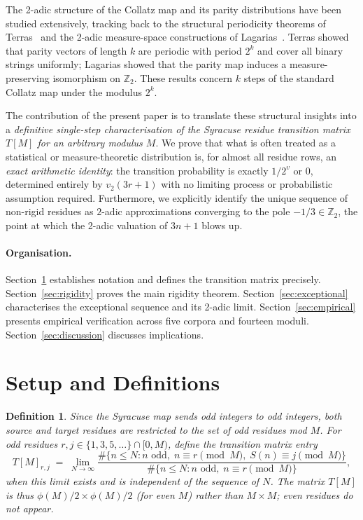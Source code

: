 \documentclass[12pt,a4paper]{article}
\newtheorem{definition}[theorem]{Definition}
\newcommand{\Ztwo}{\mathbb{Z}_2}
\begin{document}
The 2-adic structure of the Collatz map and its parity distributions have
been studied extensively, tracking back to the structural periodicity theorems
of Terras~\cite{Terras1976} and the 2-adic measure-space constructions of
Lagarias~\cite{Lagarias1985}.  Terras showed that parity vectors of length $k$
are periodic with period $2^k$ and cover all binary strings uniformly; Lagarias
showed that the parity map induces a measure-preserving isomorphism on
$\Ztwo$.  These results concern $k$ steps of the standard Collatz map under
the modulus $2^k$.

The contribution of the present paper is to translate these structural
insights into a \emph{definitive single-step characterisation of the Syracuse
residue transition matrix $T[M]$ for an arbitrary modulus $M$}.  We prove
that what is often treated as a statistical or measure-theoretic distribution
is, for almost all residue rows, an \emph{exact arithmetic identity}: the
transition probability is exactly $1/2^v$ or $0$, determined entirely by
$v_2(3r+1)$ with no limiting process or probabilistic assumption required.
Furthermore, we explicitly identify the unique sequence of non-rigid residues
as $2$-adic approximations converging to the pole $-1/3 \in \Ztwo$, the point
at which the 2-adic valuation of $3n+1$ blows up.

\paragraph{Organisation.}
Section~\ref{sec:setup} establishes notation and defines the transition matrix
precisely.  Section~\ref{sec:rigidity} proves the main rigidity theorem.
Section~\ref{sec:exceptional} characterises the exceptional sequence and its
2-adic limit.  Section~\ref{sec:empirical} presents empirical verification
across five corpora and fourteen moduli.  Section~\ref{sec:discussion} discusses
implications.

\section{Setup and Definitions}
\label{sec:setup}

\begin{definition}
Since the Syracuse map sends odd integers to odd integers, both source and target
residues are restricted to the set of odd residues mod $M$.  For odd residues
$r, j \in \{1, 3, 5, \ldots\} \cap [0, M)$, define the \emph{transition matrix
entry}
\[
  T[M]_{r,j} \;=\; \lim_{N\to\infty}
  \frac{\#\{n \leq N : n \text{ odd},\; n \equiv r \pmod{M},\; S(n) \equiv j \pmod{M}\}}
       {\#\{n \leq N : n \text{ odd},\; n \equiv r \pmod{M}\}},
\]
when this limit exists and is independent of the sequence of $N$.  The matrix
$T[M]$ is thus $\phi(M)/2 \times \phi(M)/2$ (for even $M$) rather than
$M \times M$; even residues do not appear.
\end{definition}
\end{document}

